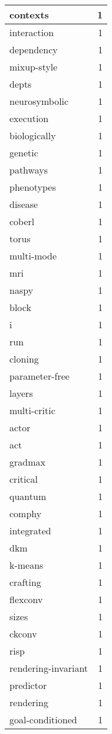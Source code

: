\begin{table}[h]
\begin{tabular}{|l|r|}
\hline
contexts & 1 \\
\hline
interaction & 1 \\
\hline
dependency & 1 \\
\hline
mixup-style & 1 \\
\hline
depts & 1 \\
\hline
neurosymbolic & 1 \\
\hline
execution & 1 \\
\hline
biologically & 1 \\
\hline
genetic & 1 \\
\hline
pathways & 1 \\
\hline
phenotypes & 1 \\
\hline
disease & 1 \\
\hline
coberl & 1 \\
\hline
torus & 1 \\
\hline
multi-mode & 1 \\
\hline
mri & 1 \\
\hline
naspy & 1 \\
\hline
block & 1 \\
\hline
i & 1 \\
\hline
run & 1 \\
\hline
cloning & 1 \\
\hline
parameter-free & 1 \\
\hline
layers & 1 \\
\hline
multi-critic & 1 \\
\hline
actor & 1 \\
\hline
act & 1 \\
\hline
gradmax & 1 \\
\hline
critical & 1 \\
\hline
quantum & 1 \\
\hline
comphy & 1 \\
\hline
integrated & 1 \\
\hline
dkm & 1 \\
\hline
k-means & 1 \\
\hline
crafting & 1 \\
\hline
flexconv & 1 \\
\hline
sizes & 1 \\
\hline
ckconv & 1 \\
\hline
risp & 1 \\
\hline
rendering-invariant & 1 \\
\hline
predictor & 1 \\
\hline
rendering & 1 \\
\hline
goal-conditioned & 1 \\

\end{tabular}
\end{table}
